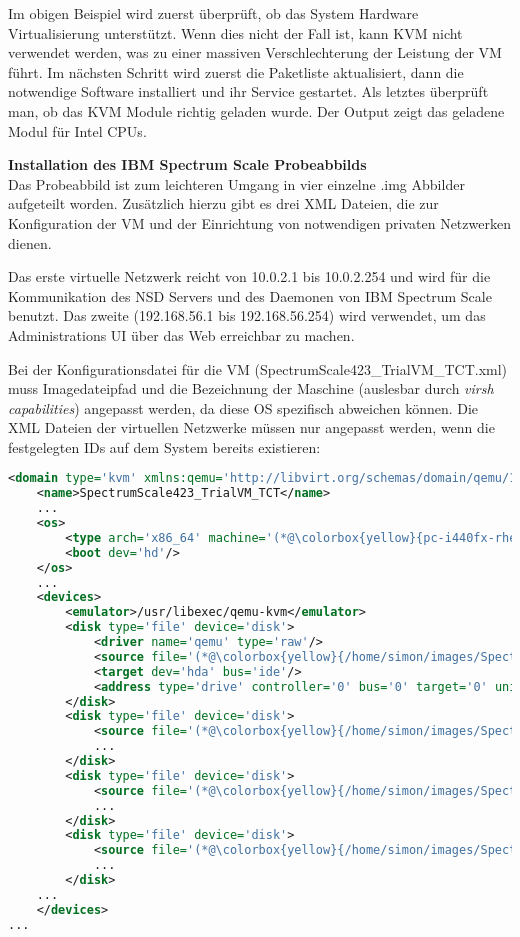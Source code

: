 Im obigen Beispiel wird zuerst überprüft, ob das System Hardware Virtualisierung unterstützt. Wenn dies nicht der Fall ist, kann KVM nicht verwendet werden, was zu einer massiven Verschlechterung der Leistung der VM führt.
Im nächsten Schritt wird zuerst die Paketliste aktualisiert, dann die notwendige Software installiert und ihr Service gestartet. Als letztes überprüft man, ob das KVM Module richtig geladen wurde. Der Output zeigt das geladene Modul für Intel CPUs.

\textbf{Installation des IBM Spectrum Scale Probeabbilds}\\
Das Probeabbild ist zum leichteren Umgang in vier einzelne .img Abbilder aufgeteilt worden. Zusätzlich hierzu gibt es drei XML Dateien, die zur Konfiguration der VM und der Einrichtung von notwendigen privaten Netzwerken dienen.

Das erste virtuelle Netzwerk reicht von 10.0.2.1 bis 10.0.2.254 und wird für die Kommunikation des \acs{NSD} Servers und des Daemonen von IBM Spectrum Scale benutzt. Das zweite (192.168.56.1 bis 192.168.56.254) wird verwendet, um das Administrations UI über das Web erreichbar zu machen.

Bei der Konfigurationsdatei für die VM (SpectrumScale423\_TrialVM\_TCT.xml) muss Imagedateipfad und die Bezeichnung der Maschine (auslesbar durch \textit{virsh capabilities}) angepasst werden, da diese OS spezifisch abweichen können. Die XML Dateien der virtuellen Netzwerke müssen nur angepasst werden, wenn die festgelegten IDs auf dem System bereits existieren: \\

\begin{lstlisting}[language=xml, caption=Veränderung der relevanten XML Konfiguration]
<domain type='kvm' xmlns:qemu='http://libvirt.org/schemas/domain/qemu/1.0'>
	<name>SpectrumScale423_TrialVM_TCT</name>
	...
	<os>
		<type arch='x86_64' machine='(*@\colorbox{yellow}{pc-i440fx-rhel7.0.0}@*)'>hvm</type> 
		<boot dev='hd'/>
	</os>
	...
	<devices>
		<emulator>/usr/libexec/qemu-kvm</emulator>
		<disk type='file' device='disk'>
			<driver name='qemu' type='raw'/>
			<source file='(*@\colorbox{yellow}{/home/simon/images/SpectrumScale421\_TrialVM-disk1.img}@*)'/>
			<target dev='hda' bus='ide'/>
			<address type='drive' controller='0' bus='0' target='0' unit='0'/>
		</disk>
		<disk type='file' device='disk'>
			<source file='(*@\colorbox{yellow}{/home/simon/images/SpectrumScale421\_TrialVM-disk2.img}@*)'/>
			...
		</disk>
		<disk type='file' device='disk'>
			<source file='(*@\colorbox{yellow}{/home/simon/images/SpectrumScale421\_TrialVM-disk3.img}@*)'/>
			...
		</disk>
		<disk type='file' device='disk'>
			<source file='(*@\colorbox{yellow}{/home/simon/images/SpectrumScale421\_TrialVM-disk4.img}@*)'/>
			...
		</disk>
	...
	</devices>
...
\end{lstlisting}

